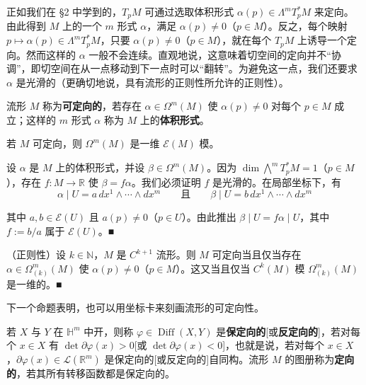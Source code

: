 正如我们在 §2 中学到的，$ T_{p}M $ 可通过选取体积形式 $ \alpha(p) \in \Lambda^{m}T_{p}^{*}M $ 来定向。由此得到 $ M $ 上的一个 $ m $ 形式 $ \alpha $，满足 $ \alpha(p) \neq 0 $（$ p \in M $）。反之，每个映射 $ p \mapsto \alpha(p) \in \Lambda^{m}T_{p}^{*}M $，只要 $ \alpha(p) \neq 0 $（$ p \in M $），就在每个 $ T_{p}M $ 上诱导一个定向。然而这样的 $ \alpha $ 一般不会连续。直观地说，这意味着切空间的定向并不“协调”，即切空间在从一点移动到下一点时可以“翻转”。为避免这一点，我们还要求 $ \alpha $ 是光滑的（更确切地说，具有流形的正则性所允许的正则性）。

流形 $ M $ 称为\textbf{可定向的}，若存在 $ \alpha \in \Omega^{m}(M) $ 使 $ \alpha(p) \neq 0 $ 对每个 $ p \in M $ 成立；这样的 $ m $ 形式 $ \alpha $ 称为 $ M $ 上的\textbf{体积形式}。

\begin{remark}

\begin{items}
\item

若 $ M $ 可定向，则 $ \Omega^{m}(M) $ 是一维 $ \mathcal{E}(M) $ 模。

\proofhead
设 $ \alpha $ 是 $ M $ 上的体积形式，并设 $ \beta \in \Omega^{m}(M) $。因为 $ \dim \bigwedge^{m}T_{p}^{*}M = 1 $（$ p \in M $），存在 $ f: M \to \mathbb{R} $ 使 $ \beta = f\alpha $。我们必须证明 $ f $ 是光滑的。在局部坐标下，有
\[
\alpha \mid U = a\,dx^{1} \wedge \cdots \wedge dx^{m} \qquad \text{且} \qquad \beta \mid U = b\,dx^{1} \wedge \cdots \wedge dx^{m}
\]

其中 $ a, b \in \mathcal{E}(U) $ 且 $ a(p) \neq 0 $（$ p \in U $）。由此推出 $ \beta \mid U = f\alpha \mid U $，其中 $ f := b/a $ 属于 $ \mathcal{E}(U) $。\nobreak\hspace{0.35em}■

\item

（正则性）设 $ k \in \mathbb{N} $，$ M $ 是 $ C^{k+1} $ 流形。则 $ M $ 可定向当且仅当存在 $ \alpha \in \Omega^{m}_{(k)}(M) $ 使 $ \alpha(p) \neq 0 $（$ p \in M $）。这又当且仅当 $ C^{k}(M) $ 模 $ \Omega^{m}_{(k)}(M) $ 是一维的。\nobreak\hspace{0.35em}■

\end{items}

下一个命题表明，也可以用坐标卡来刻画流形的可定向性。

若 $ X $ 与 $ Y $ 在 $ \mathbb{H}^{m} $ 中开，则称 $ \varphi \in \operatorname{Diff}(X,Y) $ 是\textbf{保定向的}[或\textbf{反定向的}]，若对每个 $ x \in X $ 有 $ \det \partial\varphi(x) > 0 $[或 $ \det \partial\varphi(x) < 0 $]，也就是说，若对每个 $ x \in X $，$ \partial\varphi(x) \in \mathcal{L}(\mathbb{R}^{m}) $ 是保定向的[或反定向的]自同构。流形 $ M $ 的图册称为\textbf{定向的}，若其所有转移函数都是保定向的。

\end{remark}

